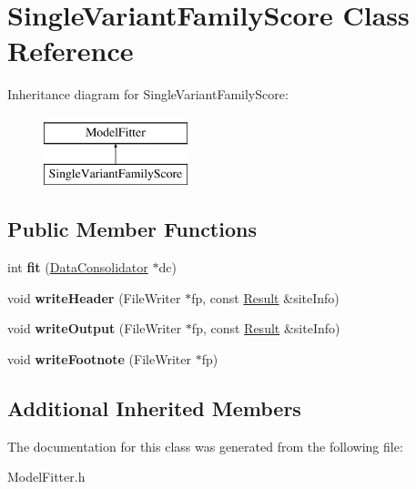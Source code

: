 \hypertarget{classSingleVariantFamilyScore}{\section{Single\-Variant\-Family\-Score Class Reference}
\label{classSingleVariantFamilyScore}
}
Inheritance diagram for Single\-Variant\-Family\-Score\-:\begin{figure}[H]
\begin{center}
\leavevmode
\includegraphics[height=2.000000cm]{classSingleVariantFamilyScore}
\end{center}
\end{figure}
\subsection*{Public Member Functions}
\begin{DoxyCompactItemize}
\item 
\hypertarget{classSingleVariantFamilyScore_ae63cc2219132c16d37e84a22696c8bb9}{int {\bfseries fit} (\hyperlink{classDataConsolidator}{Data\-Consolidator} $\ast$dc)}\label{classSingleVariantFamilyScore_ae63cc2219132c16d37e84a22696c8bb9}

\item 
\hypertarget{classSingleVariantFamilyScore_adb1cf278e977ceafac034827a313aa5d}{void {\bfseries write\-Header} (File\-Writer $\ast$fp, const \hyperlink{classResult}{Result} \&site\-Info)}\label{classSingleVariantFamilyScore_adb1cf278e977ceafac034827a313aa5d}

\item 
\hypertarget{classSingleVariantFamilyScore_a8f38cf774a4f6c5d9f671f05f4ce2514}{void {\bfseries write\-Output} (File\-Writer $\ast$fp, const \hyperlink{classResult}{Result} \&site\-Info)}\label{classSingleVariantFamilyScore_a8f38cf774a4f6c5d9f671f05f4ce2514}

\item 
\hypertarget{classSingleVariantFamilyScore_abac2194d76b94db451c987f5d6736e81}{void {\bfseries write\-Footnote} (File\-Writer $\ast$fp)}\label{classSingleVariantFamilyScore_abac2194d76b94db451c987f5d6736e81}

\end{DoxyCompactItemize}
\subsection*{Additional Inherited Members}


The documentation for this class was generated from the following file\-:\begin{DoxyCompactItemize}
\item 
Model\-Fitter.\-h\end{DoxyCompactItemize}

